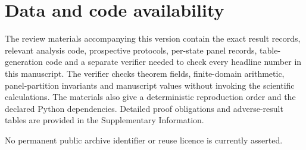 \section{Data and code availability}

The review materials accompanying this version contain the exact result records, relevant analysis code, prospective protocols, per-state panel records, table-generation code and a separate verifier needed to check every headline number in this manuscript.  The verifier checks theorem fields, finite-domain arithmetic, panel-partition invariants and manuscript values without invoking the scientific calculations.  The materials also give a deterministic reproduction order and the declared Python dependencies.  Detailed proof obligations and adverse-result tables are provided in the Supplementary Information.

No permanent public archive identifier or reuse licence is currently asserted.
